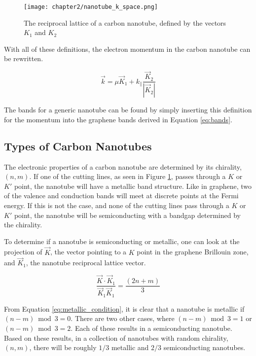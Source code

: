 \begin{figure}
    \centering
    \texttt{[image: chapter2/nanotube\_k\_space.png]}
    \caption{The reciprocal lattice of a carbon nanotube, defined by the vectors $K_1$ and $K_2$}
    \label{fig:cnt_k_space}
\end{figure}

With all of these definitions, the electron momentum in the carbon nanotube can be rewritten.

\begin{equation}
    \vec{k} = \mu\vec{K}_1 + k_{\parallel}\frac{\vec{K}_2}{|\vec{K}_2|}
    \label{eq:k_quant}
\end{equation}

The bands for a generic nanotube can be found by simply inserting this definition for the momentum into the graphene bands derived in Equation \ref{eq:bands}. 

\subsection{Types of Carbon Nanotubes}

The electronic properties of a carbon nanotube are determined by its chirality, $(n,m)$. If one of the cutting lines, as seen in Figure \ref{fig:cnt_k_space}, passes through a $K$ or $K'$ point, the nanotube will have a metallic band structure. Like in graphene, two of the valence and conduction bands will meet at discrete points at the Fermi energy. If this is not the case, and none of the cutting lines pass through a $K$ or $K'$ point, the nanotube will be semiconducting with a bandgap determined by the chirality.

To determine if a nanotube is semiconducting or metallic, one can look at the projection of $\vec{K}$, the vector pointing to a $K$ point in the graphene Brillouin zone, and $\vec{K}_1$, the nanotube reciprocal lattice vector.

\begin{equation}
    \frac{\vec{K}\cdot\vec{K}_1}{\vec{K}_1\vec{K}_1} = \frac{(2n+m)}{3} 
    \label{eq:metallic_condition}
\end{equation}

From Equation \ref{eq:metallic_condition}, it is clear that a nanotube is metallic if $(n-m)\bmod3 = 0$. There are two other cases, where $(n-m)\bmod3 = 1$ or $(n-m)\bmod3 = 2$. Each of these results in a semiconducting nanotube. Based on these results, in a collection of nanotubes with random chirality, $(n,m)$, there will be roughly $1/3$ metallic and $2/3$ semiconducting nanotubes.

